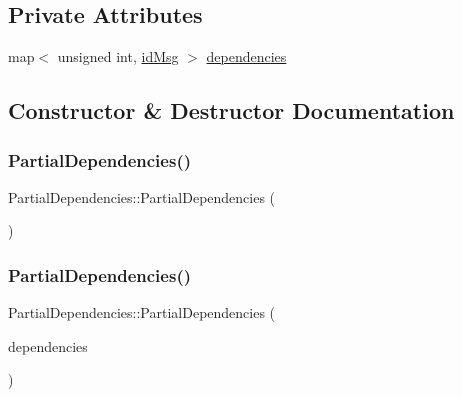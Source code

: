 \subsection*{Private Attributes}
\begin{DoxyCompactItemize}
\item 
map$<$ unsigned int, \hyperlink{structures_8h_a83a1d9a070efa5341da84cfd8e28d3e5}{id\+Msg} $>$ \hyperlink{classPartialDependencies_a4b72531ce3a3b7c4b6f02d0fe8ea1a7c}{dependencies}
\end{DoxyCompactItemize}


\subsection{Constructor \& Destructor Documentation}
\mbox{\label{classPartialDependencies_aefb05dec194a9ab63482df6645cbd842}} 
\subsubsection{\texorpdfstring{Partial\+Dependencies()}{PartialDependencies()}\hspace{0.1cm}{\footnotesize\ttfamily [1/2]}}
{\footnotesize\ttfamily Partial\+Dependencies\+::\+Partial\+Dependencies (\begin{DoxyParamCaption}{ }\end{DoxyParamCaption})}

\mbox{\label{classPartialDependencies_a1f17aad6d01c7e8cdc40bf99138eb528}} 
\subsubsection{\texorpdfstring{Partial\+Dependencies()}{PartialDependencies()}\hspace{0.1cm}{\footnotesize\ttfamily [2/2]}}
{\footnotesize\ttfamily Partial\+Dependencies\+::\+Partial\+Dependencies (\begin{DoxyParamCaption}\item[{const map$<$ unsigned int, \hyperlink{structures_8h_a83a1d9a070efa5341da84cfd8e28d3e5}{id\+Msg} $>$ \&}]{dependencies }\end{DoxyParamCaption})}

